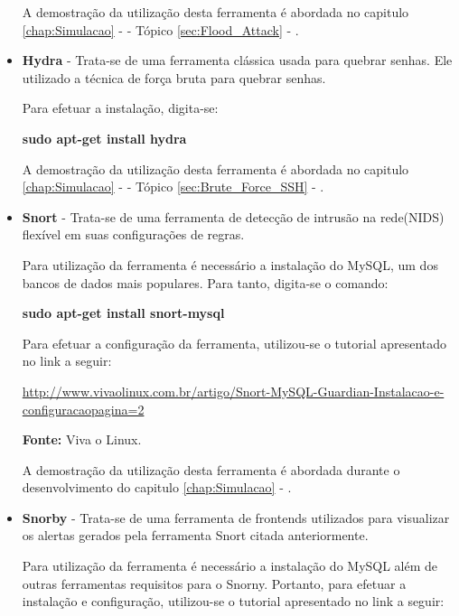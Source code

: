 \begin{itemize}
				A demostração da utilização desta ferramenta é abordada no capitulo \ref{chap:Simulacao} -  - Tópico \ref{sec:Flood_Attack} - .


				\item \textbf{Hydra} - Trata-se de uma ferramenta clássica usada para quebrar senhas. Ele utilizado a técnica de força bruta para quebrar senhas. 

				Para efetuar a instalação, digita-se:
				\begin{framed}
					\textbf{sudo apt-get install hydra}
				\end{framed}

				A demostração da utilização desta ferramenta é abordada no capitulo \ref{chap:Simulacao} -  - Tópico \ref{sec:Brute_Force_SSH} - .


				\item \textbf{Snort} - Trata-se de uma ferramenta de detecção de intrusão na rede(NIDS) flexível em suas configurações de regras. 

				Para utilização da ferramenta é necessário a instalação do MySQL, um dos bancos de dados mais populares. Para tanto, digita-se o comando:
				\begin{framed}
					\textbf{sudo apt-get install snort-mysql}
				\end{framed}

				Para efetuar a configuração da ferramenta, utilizou-se o tutorial apresentado no link a seguir:
				
				\begin{framed}
					\href{http://www.vivaolinux.com.br/artigo/Snort-MySQL-Guardian-Instalacao-e-configuracao?pagina=2}{http://www.vivaolinux.com.br/artigo/Snort-MySQL-Guardian-Instalacao-e-configuracao\?pagina=2}
				\end{framed}
				\textbf{Fonte:} Viva o Linux.

				A demostração da utilização desta ferramenta é abordada durante o desenvolvimento do capitulo \ref{chap:Simulacao} - .


				\item \textbf{Snorby} - Trata-se de uma ferramenta de frontends utilizados para visualizar os alertas gerados pela ferramenta Snort citada anteriormente. 

				Para utilização da ferramenta é necessário a instalação do MySQL além de outras ferramentas requisitos para o Snorny. Portanto, para efetuar a instalação e configuração, utilizou-se o tutorial apresentado no link a seguir:
				

\end{itemize}
